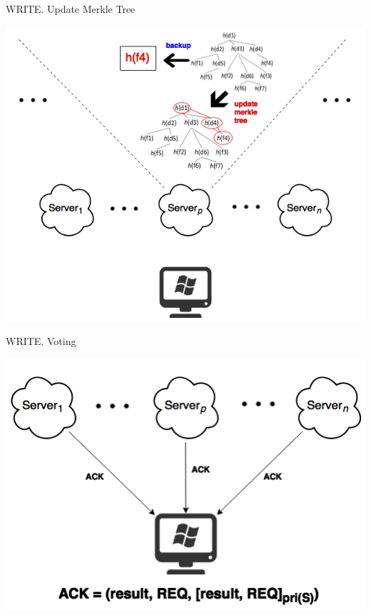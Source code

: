 \documentclass{beamer}
\newcommand{\RNum}[1]{\uppercase\expandafter{\romannumeral #1\relax}}
\begin{document}
\begin{CJK}{UTF8}{bkai}
\begin{frame}{WRITE}{\RNum{2}. Update Merkle Tree}
	\begin{center}
	\includegraphics[width=.65\textwidth]{Write2.png}
	\end{center}
\end{frame}

\begin{frame}{WRITE}{\RNum{3}. Voting}
	\begin{center}
	\includegraphics[width=.7\textwidth]{Write3.png}
	\end{center}
\end{frame}


\end{CJK}
\end{document}
